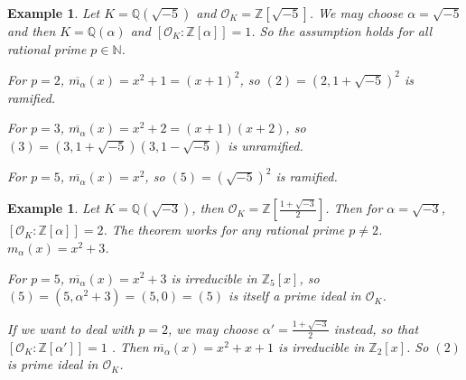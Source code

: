 \documentclass[11pt]{book}
\newtheorem{example}[theorem]{Example}
\begin{document}
\begin{example}
    Let $K=\mathbb{Q}(\sqrt{-5})$ and $\mathcal{O}_{K}=\mathbb{Z}[\sqrt{-5}]$. We may choose $\alpha=\sqrt{-5}$ and then $K=\mathbb{Q}(\alpha)$ and $[\mathcal{O}_{K}:\mathbb{Z}[\alpha]]=1$. So the assumption holds for all rational prime $p\in \mathbb{N}$. 

    For $p=2$, $\overline{m_{\alpha}}(x)=x^{2}+1=(x+1)^{2}$, so $(2)=(2,1+\sqrt{-5})^{2}$ is ramified. 

    For $p=3$, $\overline{m_{\alpha}}(x)=x^{2}+2=(x+1)(x+2)$, so $(3)=(3,1+\sqrt{-5})(3,1-\sqrt{-5})$ is unramified. 

    For $p=5$, $\overline{m_{\alpha}}(x)=x^{2}$, so $(5)=(\sqrt{-5})^{2}$ is ramified. 
\end{example}

\begin{example}
    Let $K=\mathbb{Q}(\sqrt{-3})$, then $\mathcal{O}_{K}=\mathbb{Z}[\frac{1+\sqrt{-3}}{2}]$. Then for $\alpha=\sqrt{-3}$, $[\mathcal{O}_{K}:\mathbb{Z}[\alpha]]=2$. The theorem works for any rational prime $p\neq 2$. $m_{\alpha}(x)=x^{2}+3$. 

    For $p=5$, $\overline{m_{\alpha}}(x)=x^{2}+3$ is irreducible in $\mathbb{Z}_{5}[x]$, so $(5) = (5, \alpha^2+3) = (5,0) = (5)$ is itself a prime ideal in $\mathcal{O}_{K}$. 

    If we want to deal with $p=2$, we may choose $\alpha'=\frac{1+\sqrt{-3}}{2}$ instead, so that $[\mathcal{O}_K : \mathbb{Z}[\alpha']] = 1$ . Then $\overline{m_{\alpha}}(x)=x^{2}+x+1$ is irreducible in $\mathbb{Z}_{2}[x]$. So $(2)$ is prime ideal in $\mathcal{O}_{K}$. 
\end{example}
\end{document}
